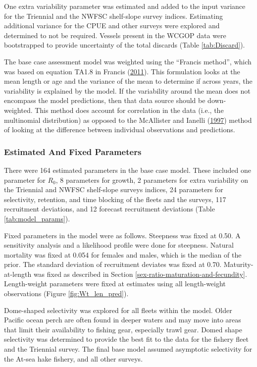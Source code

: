 \documentclass[12pt,]{article}
\begin{document}
One extra variability parameter was estimated and added to the input
variance for the Triennial and the NWFSC shelf-slope survey indices.
Estimating additional variance for the CPUE and other surveys were
explored and determined to not be required. Vessels present in the WCGOP
data were bootstrapped to provide uncertainty of the total discards
(Table \ref{tab:Discard}).

The base case assessment model was weighted using the ``Francis
method'', which was based on equation TA1.8 in Francis
(\protect\hyperlink{ref-francis_data_2011}{2011}). This formulation
looks at the mean length or age and the variance of the mean to
determine if across years, the variability is explained by the model. If
the variability around the mean does not encompass the model
predictions, then that data source should be down-weighted. This method
does account for correlation in the data (i.e., the multinomial
distribution) as opposed to the McAllister and Ianelli
(\protect\hyperlink{ref-mcallister_bayesian_1997}{1997}) method of
looking at the difference between individual observations and
predictions.

\subsubsection{Estimated And Fixed
Parameters}\label{estimated-and-fixed-parameters}

There were 164 estimated parameters in the base case model. These
included one parameter for \(R_0\), 8 parameters for growth, 2
parameters for extra variability on the Triennial and NWFSC shelf-slope
surveys indices, 24 parameters for selectivity, retention, and time
blocking of the fleets and the surveys, 117 recruitment deviations, and
12 forecast recruitment deviations (Table \ref{tab:model_params}).

Fixed parameters in the model were as follows. Steepness was fixed at
0.50. A sensitivity analysis and a likelihood profile were done for
steepness. Natural mortality was fixed at 0.054 for females and males,
which is the median of the prior. The standard deviation of recruitment
deviates was fixed at 0.70. Maturity-at-length was fixed as described in
Section \ref{sex-ratio-maturation-and-fecundity}. Length-weight
parameters were fixed at estimates using all length-weight observations
(Figure \ref{fig:Wt_len_pred}).

Dome-shaped selectivity was explored for all fleets within the model.
Older Pacific ocean perch are often found in deeper waters and may move
into areas that limit their availability to fishing gear, especially
trawl gear. Domed shape selectivity was determined to provide the best
fit to the data for the fishery fleet and the Triennial survey. The
final base model assumed asymptotic selectivity for the At-sea hake
fishery, and all other surveys.
\end{document}
